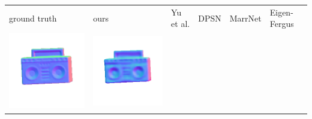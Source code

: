 \begin{center}
\begin{tabularx}{\linewidth}{@{}Y@{}Y@{}Y@{}Y@{}Y@{}Y@{}}
ground truth & ours & Yu et al. & DPSN & MarrNet & Eigen-Fergus \\
\includegraphics[width=\linewidth]{semisynthetic/20150514_19_gt.png} &
\includegraphics[width=\linewidth]{semisynthetic/20150514_19_ours_out.png} &

\end{tabularx}
\end{center}
